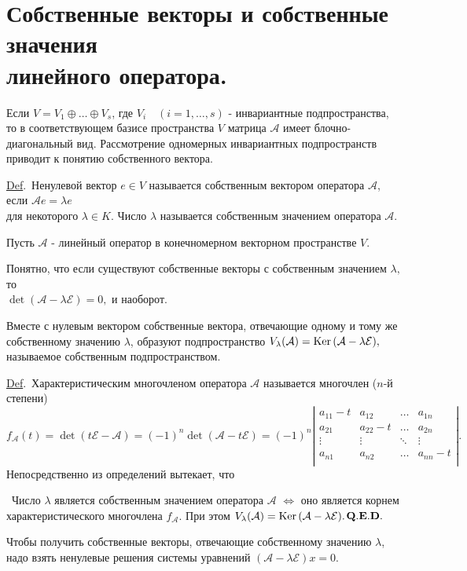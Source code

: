 \documentclass[draft]{article}%
\newcommand{\de}{\par\noindent\underline{Def}.\ }%
\newcommand{\ab}{\par\noindent}%
\newcommand{\te}{\par\noindent{\bf Теорема.}\ }%
\newcommand{\qed}{\quad${{\bf Q.E.D.}}$}
\newcommand{\lr}{\Leftrightarrow}%
\newcommand{\ps}{\oplus}
\newcommand{\rom}[1]{{\rm#1\,}}
\newcommand{\op}[1]{$\mathcal{#1}$}
\newcommand{\om}[1]{\mathcal{#1}}
\begin{document}
\section{Собственные векторы и собственные значения\\ линейного оператора.}
\label{q25}%
\ab Если $V=V_1\ps\dots\ps V_s$, где $V_i\quad (i=1,\dots,s)$ - инвариантные подпространства, то в
соответствующем базисе пространства $V$ матрица \op{A} имеет блочно-диагональный вид. Рассмотрение одномерных
инвариантных подпространств приводит к понятию собственного вектора. %
\de Ненулевой вектор $e\in V$ называется собственным вектором оператора \op{A}, если $\om{A}e=\lambda e$\\ для
некоторого $\lambda \in K.$ Число $\lambda$ называется собственным значением оператора \op{A}. %
\ab Пусть \op{A} - линейный оператор в конечномерном векторном пространстве $V$. %
\ab Понятно, что если существуют собственные векторы с собственным значением $\lambda,$ то \\
$\det(\om{A}-\lambda\om{E})=0,$ и наоборот.%
\ab Вместе с нулевым вектором собственные вектора, отвечающие одному и тому же собственному значению $\lambda$,
образуют подпространство $V_\lambda(\om{A})=\rom{Ker}(\om{A}-\lambda\om{E}),$ называемое собственным
подпространством.%
\de Характеристическим многочленом оператора \op{A} называется многочлен ($n$-й степени)
$$
f_{\om{A}}(t)=\det(t\om{E-A})=(-1)^n\det(\om{A}-t\om{E})=(-1)^n\left|%
\begin{array}{cccc}
  a_{11}-t & a_{12} & \dots & a_{1n} \\
  a_{21} & a_{22}-t & \dots & a_{2n} \\
  \vdots & \vdots & \ddots & \vdots \\
  a_{n1} & a_{n2} & \dots & a_{nn}-t \\
\end{array}%
\right|.
$$
Непосредственно из определений вытекает, что %
\te Число $\lambda$ является собственным значением оператора \op{A} $\lr$ оно является корнем
характеристического многочлена $f_{\om{A}}.$ При этом
$V_\lambda(\om{A})=\rom{Ker}(\om{A}-\lambda\om{E}).$\qed %
\ab Чтобы получить собственные векторы, отвечающие собственному значению $\lambda$, надо взять ненулевые решения
системы уравнений $(\om{A}-\lambda\om{E})x=0.$ %
\end{document}
